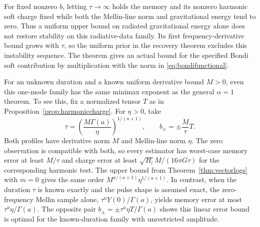 For fixed nonzero $b$, letting $\tau\to\infty$ holds the memory and
its nonzero harmonic soft charge fixed while both the Mellin-line norm
and gravitational energy tend to zero. Thus a uniform upper bound on
radiated gravitational energy alone does not restore stability on this
radiative-data family. Its first frequency-derivative bound grows with
$\tau$, so the uniform prior in the recovery theorem excludes this
instability sequence. The theorem gives an actual bound for the
specified Bondi soft contribution by multiplication with the norm in
\eqref{eq:bondifunctional}.

For an unknown duration and a known uniform derivative bound $M>0$,
even this one-mode family has the same minimax exponent as the general
$\alpha=1$ theorem. To see this, fix a normalized tensor $T$ as in
Proposition~\ref{prop:harmoniccharge}. For $\eta>0$, take
\[
 \tau=\left(\frac{M\Gamma(a)}{\eta}\right)^{1/(a+1)},
 \qquad b_{\pm}=\pm\frac{M}{\tau}T.
\]
Both profiles have derivative norm $M$ and Mellin-line norm $\eta$.
The zero observation is compatible with both, so every estimator
has worst-case memory error at least $M/\tau$ and charge error at least
$\sqrt{H_l}M/(16\pi G\tau)$ for the corresponding harmonic test.
The upper bound from Theorem~\ref{thm:vectorlogs} with $m=0$ gives the
same order $M^{a/(a+1)}\eta^{1/(a+1)}$. In contrast, when the duration
$\tau$ is known exactly and the pulse shape is assumed exact, the
zero-frequency Mellin sample alone, $\tau^aY(0)/\Gamma(a)$, yields
memory error at most $\tau^a\eta/\Gamma(a)$. The opposite pair
$b_\pm=\pm\tau^a\eta T/\Gamma(a)$ shows this linear error bound is
optimal for the known-duration family with unrestricted amplitude.

